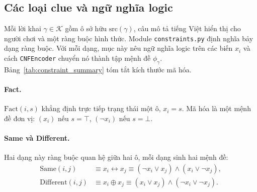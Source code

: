 \subsection{Các loại clue và ngữ nghĩa logic}
\label{sec:clue_semantics}

Mỗi lời khai $\gamma \in \mathcal{K}$ gồm ô sở hữu $\mathrm{src}(\gamma)$, câu
mô tả tiếng Việt hiển thị cho người chơi và một ràng buộc hình thức. Module
\texttt{constraints.py} định nghĩa bảy dạng ràng buộc. Với mỗi dạng, mục này
nêu ngữ nghĩa logic trên các biến $x_i$ và cách \texttt{CNFEncoder} chuyển nó
thành tập mệnh đề $\phi_\gamma$. Bảng~\ref{tab:constraint_summary} tóm tắt kích
thước mã hóa.

\paragraph{Fact.}
$\mathrm{Fact}(i, s)$ khẳng định trực tiếp trạng thái một ô, $x_i = s$. Mã hóa
là một mệnh đề đơn vị: $(x_i)$ nếu $s=\top$, $(\neg x_i)$ nếu $s=\bot$.

\paragraph{Same và Different.}
Hai dạng này ràng buộc quan hệ giữa hai ô, mỗi dạng sinh hai mệnh đề:
\begin{align}
  \mathrm{Same}(i,j) &\equiv x_i \leftrightarrow x_j
    \equiv (\neg x_i \lor x_j) \land (x_i \lor \neg x_j), \\
  \mathrm{Different}(i,j) &\equiv x_i \oplus x_j
    \equiv (x_i \lor x_j) \land (\neg x_i \lor \neg x_j).
\end{align}

